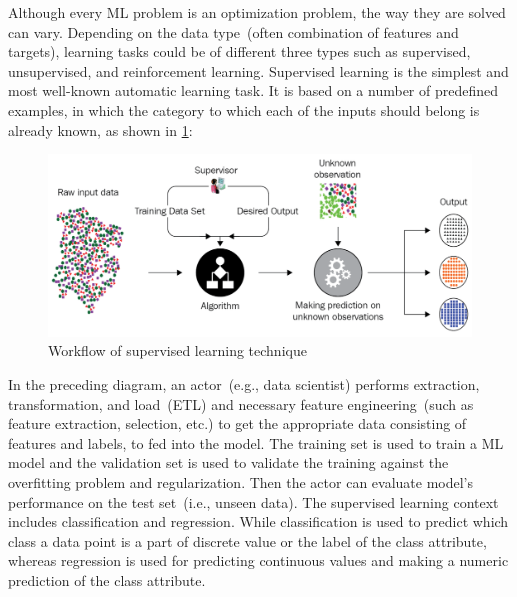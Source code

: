 \hspace*{3.5mm} Although every ML problem is an optimization problem, the way they are solved can vary. Depending on the data type~(often combination of features and targets), learning tasks could be of different three types such as supervised, unsupervised, and reinforcement learning. Supervised learning is the simplest and most well-known automatic learning task. It is based on a number of predefined examples, in which the category to which each of the inputs should belong is already known, as shown in \cref{fig:ml_pipeline_sup}:

\begin{figure}[h]
	\centering
	\includegraphics[scale=0.7]{images/sup.png}
	\caption{Workflow of supervised learning technique~\cite{karimScalaML2019}} 
	\label{fig:ml_pipeline_sup}
\end{figure}

\hspace*{3.5mm} In the preceding diagram, an actor~(e.g., data scientist) performs extraction, transformation, and load~(ETL) and necessary feature engineering~(such as feature extraction, selection, etc.) to get the appropriate data consisting of features and labels, to fed into the model. The training set is used to train a ML model and the validation set is used to validate the training against the overfitting problem and regularization. Then the actor can evaluate model's performance on the test set~(i.e., unseen data). The supervised learning context includes classification and regression. While classification is used to predict which class a data point is a part of discrete value or the label of the class attribute, whereas regression is used for predicting continuous values and making a numeric prediction of the class attribute.

